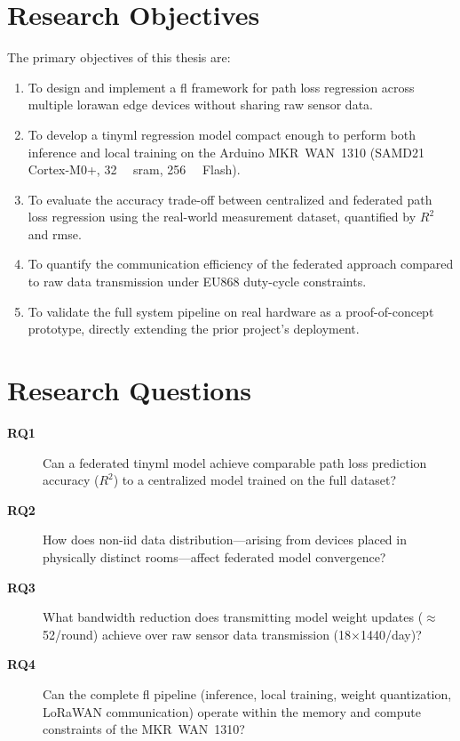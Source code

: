 \section{Research Objectives}
\label{sec:objectives}

The primary objectives of this thesis are:
\begin{enumerate}
  \item To design and implement a \gls{fl} framework for path loss regression across
        multiple \gls{lorawan} edge devices without sharing raw sensor data.
  \item To develop a \gls{tinyml} regression model compact enough to perform both
        inference and local training on the Arduino MKR~WAN~1310
        (SAMD21 Cortex-M0+, \SI{32}{\kilo\byte} \gls{sram}, \SI{256}{\kilo\byte} Flash).
  \item To evaluate the accuracy trade-off between centralized and federated path loss
        regression using the real-world measurement dataset, quantified by $R^2$ and
        \gls{rmse}.
  \item To quantify the communication efficiency of the federated approach compared to
        raw data transmission under EU868 duty-cycle constraints.
  \item To validate the full system pipeline on real hardware as a proof-of-concept
        prototype, directly extending the prior project's deployment.
\end{enumerate}

\section{Research Questions}
\label{sec:research-questions}

\begin{description}
  \item[\textbf{RQ1}] Can a federated \gls{tinyml} model achieve comparable path loss
    prediction accuracy ($R^2$) to a centralized model trained on the full dataset?

  \item[\textbf{RQ2}] How does non-\gls{iid} data distribution---arising from devices
    placed in physically distinct rooms---affect federated model convergence?

  \item[\textbf{RQ3}] What bandwidth reduction does transmitting model weight updates
    ($\approx$\,\SI{52}{\byte}/round) achieve over raw sensor data transmission
    (\SI{18}{\byte}$\times$1440/day)?

  \item[\textbf{RQ4}] Can the complete \gls{fl} pipeline (inference, local training,
    weight quantization, LoRaWAN communication) operate within the memory and compute
    constraints of the MKR~WAN~1310?
\end{description}


